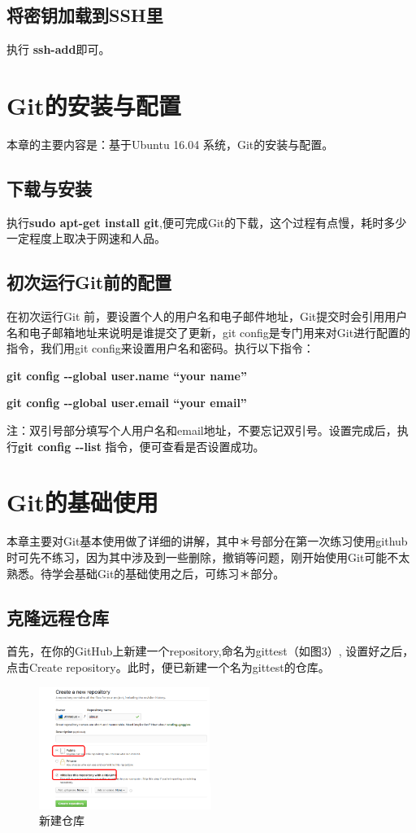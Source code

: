\documentclass{article}
\begin{document}
\subsection{将密钥加载到SSH里}
执行 \textbf{ssh-add}即可。

\newpage
\section{Git的安装与配置}
本章的主要内容是：基于Ubuntu 16.04 系统，Git的安装与配置。

\subsection{下载与安装}
执行\textbf{sudo apt-get install git},便可完成Git的下载，这个过程有点慢，耗时多少一定程度上取决于网速和人品。

\subsection{初次运行Git前的配置}
在初次运行Git 前，要设置个人的用户名和电子邮件地址，Git提交时会引用用户名和电子邮箱地址来说明是谁提交了更新，git config是专门用来对Git进行配置的指令，我们用git config来设置用户名和密码。执行以下指令：

\textbf{git config {-}{-}global user.name “your name”}

\textbf{git config {-}{-}global user.email “your email”}

注：双引号部分填写个人用户名和email地址，不要忘记双引号。设置完成后，执行\textbf{git config {-}{-}list }指令，便可查看是否设置成功。

\section{Git的基础使用}

本章主要对Git基本使用做了详细的讲解，其中＊号部分在第一次练习使用github时可先不练习，因为其中涉及到一些删除，撤销等问题，刚开始使用Git可能不太熟悉。待学会基础Git的基础使用之后，可练习＊部分。

\subsection{克隆远程仓库}
首先，在你的GitHub上新建一个repository,命名为gittest（如图3）, 设置好之后，点击Create repository。此时，便已新建一个名为gittest的仓库。

\begin{figure}[!htb] %
\centering \includegraphics[width=0.5\textwidth]{fig3.png} \caption{新建仓库}
\label{fig:1}
\end{figure}
\end{document}
